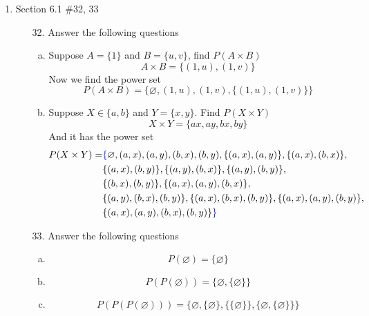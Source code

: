 \documentclass[12pt]{article}
\newcommand{\paren}[1]{\left( #1 \right)}
\begin{document}
\begin{enumerate}
\begin{enumerate}
        \end{enumerate}
    \newpage

    \item Section 6.1 \#32, 33
        \begin{enumerate}
            \item[32.]  Answer the following questions
                \begin{enumerate}[a.]
                    \item Suppose $A = \{1\}$ and $B = \{u,v\}$, find $P(A \times B)$
                    \[
                    A \times B = \{ \paren{1,u},\paren{1,v}\}
                    \]
                    Now we find the power set 
                    \[
                    P\paren{A \times B} = \{\varnothing, \paren{1,u}, \paren{1,v}, \{ \paren{1,u},\paren{1,v}\}\}
                    \]

                    \item Suppose $X \in \{a,b\}$ and $Y = \{x,y\}$. Find $P(X \times Y)$
                    \[
                    X \times Y = \{ ax,ay,bx,by \}
                    \]
                    And it has the power set
                    \begin{align*}
                    P(X \times Y) =& \textcolor{blue}{\{ } \varnothing, (a, x), (a, y), (b, x), (b, y), \{(a, x), (a, y)\}, \{(a, x), (b, x)\}, \\
                    & \{(a, x), (b, y)\}, \{(a, y), (b, x)\}, \{(a, y), (b, y)\}, \\
                    &\{(b, x), (b, y)\}, \{(a, x), (a, y), (b, x)\}, \\
                    & \{(a, y), (b, x), (b, y)\}, \{(a, x), (b, x), (b, y)\}, \{(a, x), (a, y), (b, y)\}, \\
                    & \{(a, x), (a, y), (b, x), (b, y)\} \textcolor{blue}{\}}
                    \end{align*}
                \end{enumerate}

            \item[33.] Answer the following questions
                \begin{enumerate}[a.]
                    \item 
                    \[
                    P(\varnothing) = \{ \varnothing \}
                    \]
                    \item
                    \[
                    P\paren{P\paren{\varnothing}} = \{ \varnothing, \{ \varnothing \} \}
                    \]
                    \item 
                    \[
                    P\paren{P\paren{P\paren{\varnothing}}} = 
                    \{ \varnothing, \{\varnothing\} , \{\{ \varnothing \}\}, \{ \varnothing, \{ \varnothing \}\}\}
                    \]
                \end{enumerate}
        \end{enumerate}
    \newpage
    

\end{enumerate}
\end{document}
